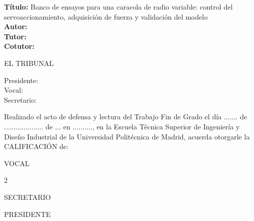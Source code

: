 \cleardoublepage

\begin{flushleft} \large
\textbf{Título:} Banco de ensayos para una caracola de radio variable: control del
servoaccionamiento, adquisición de fuerza y validación del modelo \\
\textbf{Autor:} \autortfg\\
\textbf{Tutor:}  \\
\textbf{Cotutor:} \\ [1 cm]

\end{flushleft}

\begin{center} \LARGE
EL TRIBUNAL \\ [1 cm]
\end{center}

\begin{flushleft} \LARGE
Presidente: \\ [1 cm]
Vocal: \\ [1 cm]
Secretario: \\ [1.5 cm]
\end{flushleft}

\large
Realizado el acto de defensa y lectura del Trabajo Fin de Grado el día ....... de
....................   de ... en .........., en la Escuela Técnica Superior de Ingeniería y
Diseño Industrial de la Universidad Politécnica de Madrid, acuerda otorgarle la CALIFICACIÓN
de: \\ [2 cm]

\begin{center}
 \large VOCAL \\ [2.2 cm]
\end{center}

\begin{multicols}{2}
\begin{flushleft}
\large SECRETARIO
\end{flushleft}

\begin{flushleft}
\large PRESIDENTE
\end{flushleft}
\end{multicols}

\normalsize
